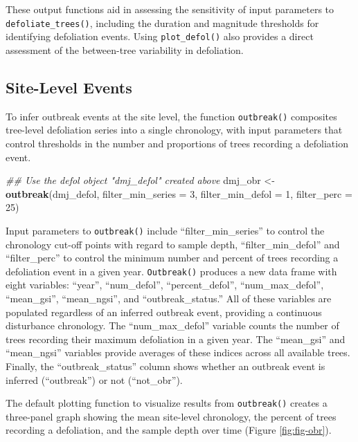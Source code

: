 \documentclass[review]{elsarticle} %
\newenvironment{Shaded}{\begin{snugshade}}{\end{snugshade}}
\newcommand{\CommentTok}[1]{\textcolor[rgb]{0.56,0.35,0.01}{\textit{#1}}}
\newcommand{\DataTypeTok}[1]{\textcolor[rgb]{0.13,0.29,0.53}{#1}}
\newcommand{\DecValTok}[1]{\textcolor[rgb]{0.00,0.00,0.81}{#1}}
\newcommand{\KeywordTok}[1]{\textcolor[rgb]{0.13,0.29,0.53}{\textbf{#1}}}
\newcommand{\NormalTok}[1]{#1}
\newcommand{\StringTok}[1]{\textcolor[rgb]{0.31,0.60,0.02}{#1}}
\begin{document}
These output functions aid in assessing the sensitivity of input parameters to \texttt{defoliate\_trees()}, including the duration and magnitude thresholds for identifying defoliation events. Using \texttt{plot\_defol()} also provides a direct assessment of the between-tree variability in defoliation.

\hypertarget{site-level-events}{%
\subsection{Site-Level Events}\label{site-level-events}}

To infer outbreak events at the site level, the function \texttt{outbreak()} composites tree-level defoliation series into a single chronology, with input parameters that control thresholds in the number and proportions of trees recording a defoliation event.

\begin{Shaded}
\begin{Highlighting}[]
\CommentTok{## Use the defol object "dmj_defol" created above}
\NormalTok{dmj_obr <-}\StringTok{ }\KeywordTok{outbreak}\NormalTok{(dmj_defol,}
                    \DataTypeTok{filter_min_series =} \DecValTok{3}\NormalTok{,}
                    \DataTypeTok{filter_min_defol =} \DecValTok{1}\NormalTok{,}
                    \DataTypeTok{filter_perc =} \DecValTok{25}\NormalTok{)}
\end{Highlighting}
\end{Shaded}

Input parameters to \texttt{outbreak()} include ``filter\_min\_series'' to control the chronology cut-off points with regard to sample depth, ``filter\_min\_defol'' and ``filter\_perc'' to control the minimum number and percent of trees recording a defoliation event in a given year. \texttt{Outbreak()} produces a new data frame with eight variables: ``year'', ``num\_defol'', ``percent\_defol'', ``num\_max\_defol'', ``mean\_gsi'', ``mean\_ngsi'', and ``outbreak\_status.'' All of these variables are populated regardless of an inferred outbreak event, providing a continuous disturbance chronology. The ``num\_max\_defol'' variable counts the number of trees recording their maximum defoliation in a given year. The ``mean\_gsi'' and ``mean\_ngsi'' variables provide averages of these indices across all available trees. Finally, the ``outbreak\_status'' column shows whether an outbreak event is inferred (``outbreak'') or not (``not\_obr'').

The default plotting function to visualize results from \texttt{outbreak()} creates a three-panel graph showing the mean site-level chronology, the percent of trees recording a defoliation, and the sample depth over time (Figure \ref{fig:fig-obr}).
\end{document}
